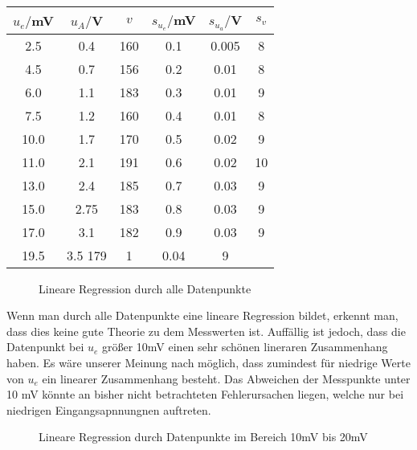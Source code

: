 \begin{table}[h]
    \centering
    \begin{tabular}[h]{c|c|c|c|c|c}


        $u_e/$mV & $u_A/$V & $v$ & $s_{u_e}/$mV&  $s_{u_a}/$V & $s_v$ \\
       \hline
        2.5 & 0.4 & 160 & 0.1 & 0.005 & 8 \\
        4.5 & 0.7 & 156 & 0.2 & 0.01 & 8\\
        6.0 & 1.1 & 183 & 0.3 & 0.01 & 9\\
        7.5 & 1.2 & 160 & 0.4 & 0.01 & 8\\
        10.0 & 1.7 & 170 & 0.5 & 0.02 & 9\\
        11.0 & 2.1 & 191 & 0.6 & 0.02 & 10\\
        13.0 & 2.4 & 185 & 0.7 & 0.03 & 9\\
        15.0 & 2.75 & 183 & 0.8 & 0.03 & 9\\
        17.0 & 3.1 & 182 & 0.9 & 0.03 & 9\\
        19.5 & 3.5 179 & 1 & 0.04 & 9\\

    \end{tabular}
\end{table}
\begin{figure}[h]
    \centering
    \caption{Lineare Regression durch alle Datenpunkte}
\end{figure}
Wenn man durch alle Datenpunkte eine lineare Regression bildet, erkennt man, dass dies keine gute Theorie zu dem Messwerten ist.
Auffällig ist jedoch, dass die Datenpunkt bei $u_e$ größer 10mV einen sehr schönen lineraren Zusammenhang haben. 
Es wäre unserer Meinung nach möglich, dass zumindest für niedrige Werte von $u_e$ ein linearer Zusammenhang besteht. 
Das Abweichen der Messpunkte unter 10 mV könnte an bisher nicht betrachteten Fehlerursachen liegen, welche nur bei niedrigen Eingangsapnnungnen auftreten.
\begin{figure}[h]
    \centering
    \caption{Lineare Regression durch Datenpunkte im Bereich 10mV bis 20mV}
\end{figure}
